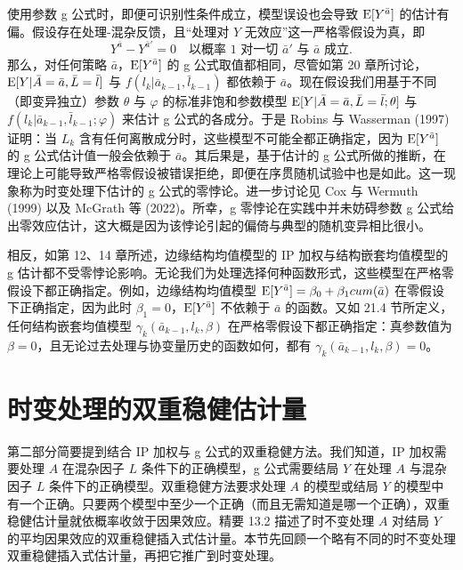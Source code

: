 \begin{techpoint}[g 零悖论]
使用参数 g 公式时，即便可识别性条件成立，模型误设也会导致 $\mathrm{E}[Y^{\bar a}]$ 的估计有偏。假设存在处理-混杂反馈，且“处理对 $Y$ 无效应”这一严格零假设为真，即
\[
Y^{\bar a}-Y^{\bar a'}=0\quad\text{以概率 1 对一切 }\bar a'\text{ 与 }\bar a\text{ 成立}.
\]
那么，对任何策略 $\bar a$，$\mathrm{E}[Y^{\bar a}]$ 的 g 公式取值都相同，尽管如第 20 章所讨论，$\mathrm{E}[Y|\bar A=\bar a,\bar L=\bar l]$ 与 $f(l_k|\bar a_{k-1},\bar l_{k-1})$ 都依赖于 $\bar a$。现在假设我们用基于不同（即变异独立）参数 $\theta$ 与 $\varphi$ 的标准非饱和参数模型 $\mathrm{E}[Y|\bar A=\bar a,\bar L=\bar l;\theta]$ 与 $f(l_k|\bar a_{k-1},\bar l_{k-1};\varphi)$ 来估计 g 公式的各成分。于是 Robins 与 Wasserman (1997) 证明：当 $L_k$ 含有任何离散成分时，这些模型不可能全都正确指定，因为 $\mathrm{E}[Y^{\bar a}]$ 的 g 公式估计值一般会依赖于 $\bar a$。其后果是，基于估计的 g 公式所做的推断，在理论上可能导致严格零假设被错误拒绝，即便在序贯随机试验中也是如此。这一现象称为时变处理下估计的 g 公式的零悖论。进一步讨论见 Cox 与 Wermuth (1999) 以及 McGrath 等 (2022)。所幸，g 零悖论在实践中并未妨碍参数 g 公式给出零效应估计，这大概是因为该悖论引起的偏倚与典型的随机变异相比很小。

相反，如第 12、14 章所述，边缘结构均值模型的 IP 加权与结构嵌套均值模型的 g 估计都不受零悖论影响。无论我们为处理选择何种函数形式，这些模型在严格零假设下都正确指定。例如，边缘结构均值模型 $\mathrm{E}[Y^{\bar a}]=\beta_0+\beta_1cum(\bar a)$ 在零假设下正确指定，因为此时 $\beta_1=0$，$\mathrm{E}[Y^{\bar a}]$ 不依赖于 $\bar a$ 的函数。又如 21.4 节所定义，任何结构嵌套均值模型 $\gamma_k(\bar a_{k-1},l_k,\beta)$ 在严格零假设下都正确指定：真参数值为 $\beta=0$，且无论过去处理与协变量历史的函数如何，都有 $\gamma_k(\bar a_{k-1},l_k,\beta)=0$。
\end{techpoint}

\section{时变处理的双重稳健估计量}

第二部分简要提到结合 IP 加权与 g 公式的双重稳健方法。我们知道，IP 加权需要处理 $A$ 在混杂因子 $L$ 条件下的正确模型，g 公式需要结局 $Y$ 在处理 $A$ 与混杂因子 $L$ 条件下的正确模型。双重稳健方法要求处理 $A$ 的模型或结局 $Y$ 的模型中有一个正确。只要两个模型中至少一个正确（而且无需知道是哪一个正确），双重稳健估计量就依概率收敛于因果效应。精要 13.2 描述了时不变处理 $A$ 对结局 $Y$ 的平均因果效应的双重稳健插入式估计量。本节先回顾一个略有不同的时不变处理双重稳健插入式估计量，再把它推广到时变处理。

